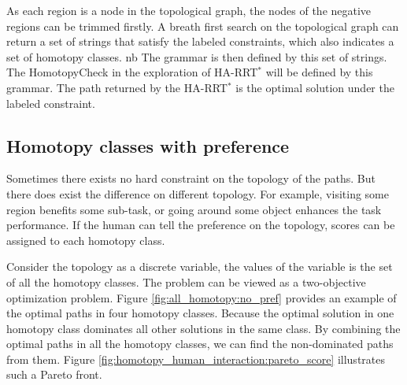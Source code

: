 \documentclass[letterpaper, 10 pt, conference]{ieeeconf}
\begin{document}
As each region is a node in the topological graph, the nodes of the negative regions can be trimmed firstly.
A breath first search on the topological graph can return a set of strings that satisfy the labeled constraints, which also indicates a set of homotopy classes. nb
The grammar is then defined by this set of strings.
The {\sc HomotopyCheck} in the exploration of HA-RRT$^{*}$ will be defined by this grammar.
The path returned by the HA-RRT$^{*}$ is the optimal solution under the labeled constraint.

\subsection{Homotopy classes with preference}

Sometimes there exists no hard constraint on the topology of the paths.
But there does exist the difference on different topology.
For example, visiting some region benefits some sub-task, or going around some object enhances the task performance.
If the human can tell the preference on the topology, scores can be assigned to each homotopy class.

Consider the topology as a discrete variable, the values of the variable is the set of all the homotopy classes.
The problem can be viewed as a two-objective optimization problem.
Figure \ref{fig:all_homotopy:no_pref} provides an example of the optimal paths in four homotopy classes.
Because the optimal solution in one homotopy class dominates all other solutions in the same class.
By combining the optimal paths in all the homotopy classes, we can find the non-dominated paths from them.
Figure \ref{fig:homotopy_human_interaction:pareto_score} illustrates such a Pareto front.
\end{document}
